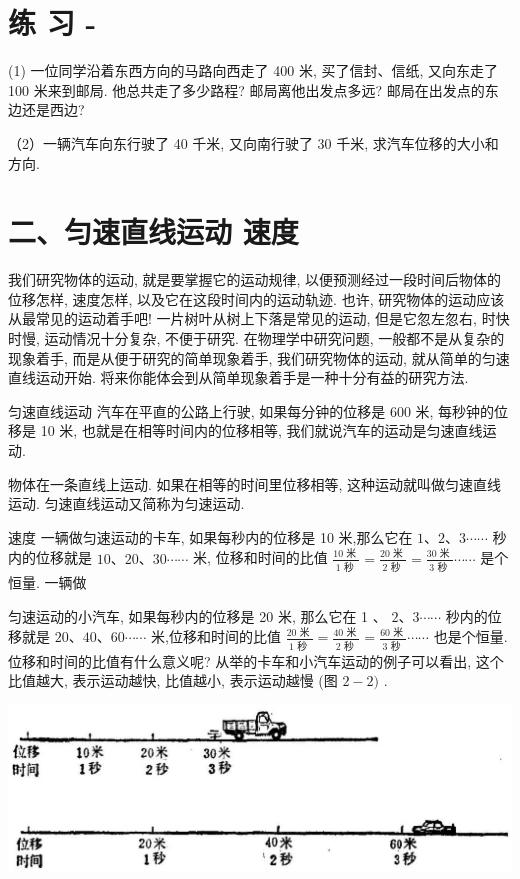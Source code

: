 \documentclass[10pt]{article}
\begin{document}
\section*{练 习 -}

(1) 一位同学沿着东西方向的马路向西走了 400 米, 买了信封、信纸, 又向东走了 100 米来到邮局. 他总共走了多少路程? 邮局离他出发点多远? 邮局在出发点的东边还是西边?

（2）一辆汽车向东行驶了 40 千米, 又向南行驶了 30 千米, 求汽车位移的大小和方向.

\section*{二、匀速直线运动 速度}

我们研究物体的运动, 就是要掌握它的运动规律, 以便预测经过一段时间后物体的位移怎样, 速度怎样, 以及它在这段时间内的运动轨迹. 也许, 研究物体的运动应该从最常见的运动着手吧! 一片树叶从树上下落是常见的运动, 但是它忽左忽右, 时快时慢, 运动情况十分复杂, 不便于研究. 在物理学中研究问题, 一般都不是从复杂的现象着手, 而是从便于研究的简单现象着手, 我们研究物体的运动, 就从简单的匀速直线运动开始. 将来你能体会到从简单现象着手是一种十分有益的研究方法.

匀速直线运动 汽车在平直的公路上行驶, 如果每分钟的位移是 600 米, 每秒钟的位移是 10 米, 也就是在相等时间内的位移相等, 我们就说汽车的运动是匀速直线运动.

物体在一条直线上运动. 如果在相等的时间里位移相等, 这种运动就叫做匀速直线运动. 匀速直线运动又简称为匀速运动.

速度 一辆做匀速运动的卡车, 如果每秒内的位移是 10 米,那么它在 \(1\text{、}2\text{、}3\cdots \cdots\) 秒内的位移就是 \({10}\text{、}{20}\text{、}{30}\cdots \cdots\) 米, 位移和时间的比值 \(\frac{{10}\text{ 米 }}{1\text{ 秒 }} = \frac{{20}\text{ 米 }}{2\text{ 秒 }} = \frac{{30}\text{ 米 }}{3\text{ 秒 }}\cdots \cdots\) 是个恒量. 一辆做

匀速运动的小汽车, 如果每秒内的位移是 20 米, 那么它在 1 、 \(2\text{、}3\cdots \cdots\) 秒内的位移就是 \({20}\text{、}{40}\text{、}{60}\cdots \cdots\) 米,位移和时间的比值 \(\frac{{20}\text{ 米 }}{1\text{ 秒 }} = \frac{{40}\text{ 米 }}{2\text{ 秒 }} = \frac{{60}\text{ 米 }}{3\text{ 秒 }}\cdots \cdots\) 也是个恒量. 位移和时间的比值有什么意义呢? 从举的卡车和小汽车运动的例子可以看出, 这个比值越大, 表示运动越快, 比值越小, 表示运动越慢 (图 \(2 - 2)\) .

\begin{center}
\includegraphics[max width=1.0\textwidth]{images/01912d55-147c-70aa-b0e0-1782a122f948_58_163927.jpg}
\end{center}
\end{document}
